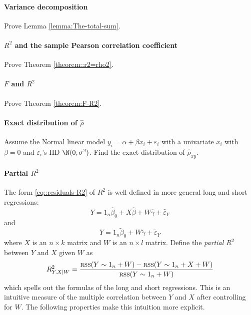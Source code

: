 \paragraph{Variance decomposition}\label{hw09::var-decompose}
Prove Lemma \ref{lemma:The-total-sum}. 


\paragraph{$R^2$ and the sample Pearson correlation coefficient}\label{hw9::r2-pcc}
Prove Theorem \ref{theorem::r2=rho2}. 



\paragraph{$F$ and $R^2$}\label{hw09::F-R2}

Prove Theorem \ref{theorem:F-R2}. 



\paragraph{Exact distribution of $\hat{\rho}$}\label{hw9::exact-d-rho}

Assume the Normal linear model $y_i = \alpha + \beta x_i + \varepsilon_i$ with
 a univariate $x_i$ with $\beta = 0$ and $\varepsilon_i$'s IID $\N(0,  \sigma^2 )$. 
 Find the exact distribution of $\hat{\rho}_{xy}$. 

 

\paragraph{Partial $R^2$}\label{hw09::partial-R2}


The form \eqref{eq::residuals-R2} of $R^2$ is well defined in more general long and short regressions:
$$
 Y  = 1_n \hat{\beta}_0 + X \hat{\beta} + W \hat{\gamma} + \hat{\varepsilon}_Y
$$
and
$$
 Y  = 1_n \tilde{\beta}_0   + W \tilde{\gamma} + \tilde{\varepsilon}_Y
$$
where $X$ is an $n\times k$ matrix and $W$ is an $n\times l$ matrix. Define the {\it partial $R^2$} between $Y$ and $X$ given $W$ as
$$
R^2_{Y.X|W} = \frac{ \textsc{rss}(Y\sim 1_n+W) -   \textsc{rss}(Y\sim 1_n+X+W) }{ \textsc{rss}(Y\sim 1_n+W) }
$$
which spells out the formulas of the long and short regressions. This is an intuitive measure of the multiple correlation between $Y$ and $X$ after controlling for $W$. The following properties make this intuition more explicit. 


